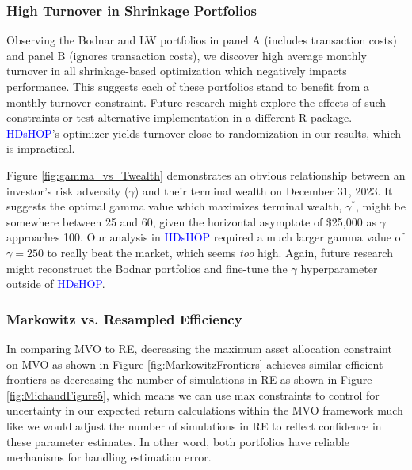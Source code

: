 \documentclass[12pt,letterpaper]{article}
\begin{document}
\subsubsection{High Turnover in Shrinkage Portfolios}

Observing the Bodnar and LW portfolios in panel A (includes transaction costs) and panel B (ignores transaction costs), we discover high average monthly turnover in all shrinkage-based optimization which negatively impacts performance. This suggests each of these portfolios stand to benefit from a monthly turnover constraint. Future research might explore the effects of such constraints or test alternative implementation in a different R package. \textcolor{blue}{HDsHOP}'s optimizer yields turnover close to randomization in our results, which is impractical.

Figure \ref{fig:gamma_vs_Twealth} demonstrates an obvious relationship between an investor's risk adversity ($\gamma$) and their terminal wealth on December 31, 2023. It suggests the optimal gamma value which maximizes terminal wealth, $\gamma^{*}$, might be somewhere between 25 and 60, given the horizontal asymptote of \$25,000 as $\gamma$ approaches 100. Our analysis in \textcolor{blue}{HDsHOP} required a much larger gamma value of $\gamma=250$ to really beat the market, which seems \textit{too} high. Again, future research might reconstruct the Bodnar portfolios and fine-tune the $\gamma$ hyperparameter outside of \textcolor{blue}{HDsHOP}.

\subsubsection{Markowitz vs. Resampled Efficiency}

In comparing MVO to RE, decreasing the maximum asset allocation constraint on MVO as shown in Figure \ref{fig:MarkowitzFrontiers} achieves similar efficient frontiers as decreasing the number of simulations in RE as shown in Figure \ref{fig:MichaudFigure5}, which means we can use max constraints to control for uncertainty in our expected return calculations within the MVO framework much like we would adjust the number of simulations in RE to reflect confidence in these parameter estimates. In other word, both portfolios have reliable mechanisms for handling estimation error.
\end{document}
